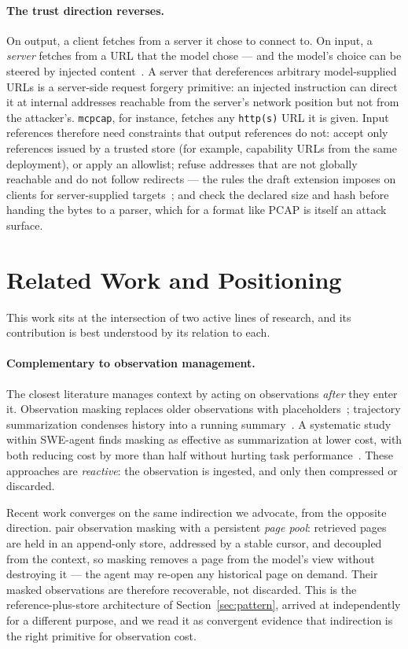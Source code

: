 \documentclass[11pt]{article}
\begin{document}
\paragraph{The trust direction reverses.} On output, a client fetches from a server it chose to connect to. On input, a \emph{server} fetches from a URL that the model chose --- and the model's choice can be steered by injected content~\citep{greshake}. A server that dereferences arbitrary model-supplied URLs is a server-side request forgery primitive: an injected instruction can direct it at internal addresses reachable from the server's network position but not from the attacker's. \texttt{mcpcap}, for instance, fetches any \texttt{http(s)} URL it is given. Input references therefore need constraints that output references do not: accept only references issued by a trusted store (for example, capability URLs from the same deployment), or apply an allowlist; refuse addresses that are not globally reachable and do not follow redirects --- the rules the draft extension imposes on clients for server-supplied targets~\citep{mcpfiles}; and check the declared size and hash before handing the bytes to a parser, which for a format like PCAP is itself an attack surface.

\section{Related Work and Positioning}\label{sec:related}

This work sits at the intersection of two active lines of research, and its contribution is best understood by its relation to each.

\paragraph{Complementary to observation management.} The closest literature manages context by acting on observations \emph{after} they enter it. Observation masking replaces older observations with placeholders~\citep{sweagent}; trajectory summarization condenses history into a running summary~\citep{openhands,supo}. A systematic study within SWE-agent finds masking as effective as summarization at lower cost, with both reducing cost by more than half without hurting task performance~\citep{complexitytrap}. These approaches are \emph{reactive}: the observation is ingested, and only then compressed or discarded.

Recent work converges on the same indirection we advocate, from the opposite direction. \citet{regimemap} pair observation masking with a persistent \emph{page pool}: retrieved pages are held in an append-only store, addressed by a stable cursor, and decoupled from the context, so masking removes a page from the model's view without destroying it --- the agent may re-open any historical page on demand. Their masked observations are therefore recoverable, not discarded. This is the reference-plus-store architecture of Section~\ref{sec:pattern}, arrived at independently for a different purpose, and we read it as convergent evidence that indirection is the right primitive for observation cost.
\end{document}
